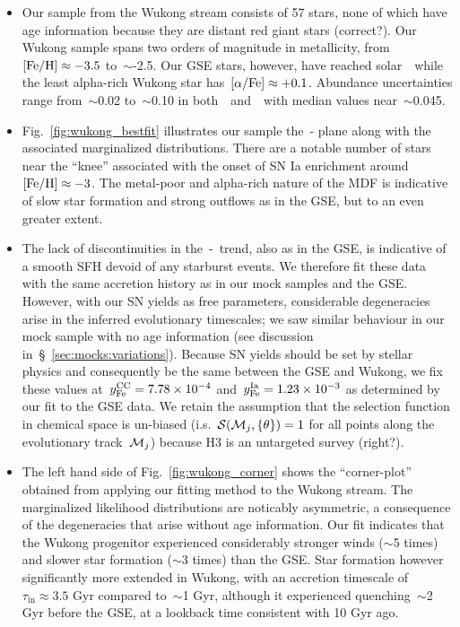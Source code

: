 \documentclass[ms.tex]{subfiles}
\begin{document}
\begin{itemize}

	\item Our sample from the Wukong stream consists of 57 stars, none of which
	have age information because they are distant red giant stars {\color{red}
	(correct?)}.
	Our Wukong sample spans two orders of magnitude in metallicity,
	from~$\text{[Fe/H]} \approx -3.5$ to~$\sim$-2.5.
	Our GSE stars, however, have reached solar~\afe~while the least alpha-rich
	Wukong star has~$\text{[$\alpha$/Fe]} \approx +0.1$.
	Abundance uncertainties range from~$\sim$0.02 to~$\sim$0.10 in
	both~\afe~and~\feh~with median values near~$\sim$0.045.

	\item Fig.~\ref{fig:wukong_bestfit} illustrates our sample the~\afe-\feh
	plane along with the associated marginalized distributions.
	There are a notable number of stars near the ``knee'' associated with the
	onset of SN Ia enrichment around~$\text{[Fe/H]} \approx -3$.
	The metal-poor and alpha-rich nature of the MDF is indicative of slow
	star formation and strong outflows as in the GSE, but to an even greater
	extent.

	\item The lack of discontinuities in the~\afe-\feh~trend, also as in the
	GSE, is indicative of a smooth SFH devoid of any starburst events.
	We therefore fit these data with the same accretion history as in our
	mock samples and the GSE.
	However, with our SN yields as free parameters, considerable degeneracies
	arise in the inferred evolutionary timescales; we saw similar behaviour in
	our mock sample with no age information (see discussion
	in~\S~\ref{sec:mocks:variations}).
	Because SN yields should be set by stellar physics and consequently be the
	same between the GSE and Wukong, we fix these values
	at~$y_\text{Fe}^\text{CC} = 7.78\times10^{-4}$ and~$y_\text{Fe}^\text{Ia} = 1.23\times10^{-3}$ as
	determined by our fit to the GSE data.
	We retain the assumption that the selection function in chemical space is
	un-biased (i.s.~$\mathcal{S}(\mathcal{M}_j, \{\theta\}) = 1$ for all points
	along the evolutionary track~$\mathcal{M}_j$) because H3 is an untargeted
	survey {\color{red} (right?)}.

	\item The left hand side of Fig.~\ref{fig:wukong_corner} shows the
	``corner-plot'' obtained from applying our fitting method to the Wukong
	stream.
	The marginalized likelihood distributions are noticably asymmetric, a
	consequence of the degeneracies that arise without age information.
	Our fit indicates that the Wukong progenitor experienced considerably
	stronger winds ($\sim$5 times) and slower star formation ($\sim$3 times)
	than the GSE.
	Star formation however significantly more extended in Wukong, with an
	accretion timescale of~$\tau_\text{in} \approx 3.5$ Gyr compared to~$\sim$1
	Gyr, although it experienced quenching~$\sim$2 Gyr before the GSE, at a
	lookback time consistent with 10 Gyr ago.


\end{itemize}
\end{document}
